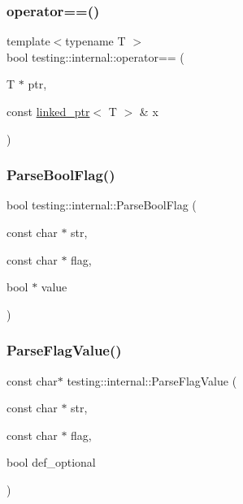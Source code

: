 \mbox{\label{namespacetesting_1_1internal_ad1cb54a206a209ddace17a05359d38ae}} 
\subsubsection{\texorpdfstring{operator==()}{operator==()}}
{\footnotesize\ttfamily template$<$typename T $>$ \\
bool testing\+::internal\+::operator== (\begin{DoxyParamCaption}\item[{T $\ast$}]{ptr,  }\item[{const \hyperlink{classtesting_1_1internal_1_1linked__ptr}{linked\+\_\+ptr}$<$ T $>$ \&}]{x }\end{DoxyParamCaption})\hspace{0.3cm}{\ttfamily [inline]}}

\mbox{\label{namespacetesting_1_1internal_ada3b98e7cfe93f4ba2053c470d9e3e51}} 
\subsubsection{\texorpdfstring{Parse\+Bool\+Flag()}{ParseBoolFlag()}}
{\footnotesize\ttfamily bool testing\+::internal\+::\+Parse\+Bool\+Flag (\begin{DoxyParamCaption}\item[{const char $\ast$}]{str,  }\item[{const char $\ast$}]{flag,  }\item[{bool $\ast$}]{value }\end{DoxyParamCaption})}

\mbox{\label{namespacetesting_1_1internal_a8bfd56af5e4a89bfb76f7e1723e41b03}} 
\subsubsection{\texorpdfstring{Parse\+Flag\+Value()}{ParseFlagValue()}}
{\footnotesize\ttfamily const char$\ast$ testing\+::internal\+::\+Parse\+Flag\+Value (\begin{DoxyParamCaption}\item[{const char $\ast$}]{str,  }\item[{const char $\ast$}]{flag,  }\item[{bool}]{def\+\_\+optional }\end{DoxyParamCaption})}

